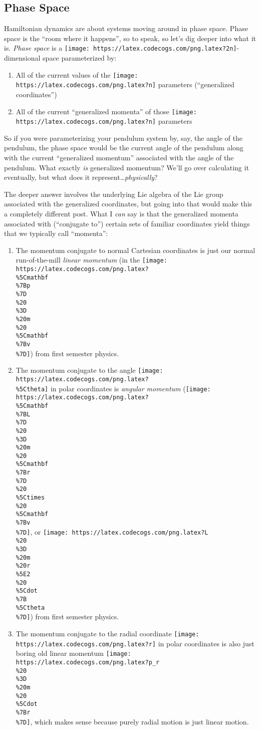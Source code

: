 \documentclass[]{article}
\begin{document}
\subsection{Phase Space}\label{phase-space}

Hamiltonian dynamics are about systems moving around in phase space. Phase space
is the ``room where it happens'', so to speak, so let's dig deeper into what it
is. \emph{Phase space} is a
\texttt{[image: https://latex.codecogs.com/png.latex?2n]}-dimensional space
parameterized by:

\begin{enumerate}
\def\labelenumi{\arabic{enumi}.}
\tightlist
\item
  All of the current values of the
  \texttt{[image: https://latex.codecogs.com/png.latex?n]} parameters
  (``generalized coordinates'')
\item
  All of the current ``generalized momenta'' of those
  \texttt{[image: https://latex.codecogs.com/png.latex?n]} parameters
\end{enumerate}

So if you were parameterizing your pendulum system by, say, the angle of the
pendulum, the phase space would be the current angle of the pendulum along with
the current ``generalized momentum'' associated with the angle of the pendulum.
What exactly \emph{is} generalized momentum? We'll go over calculating it
eventually, but what does it represent\ldots{}\emph{physically}?

The deeper answer involves the underlying Lie algebra of the Lie group
associated with the generalized coordinates, but going into that would make this
a completely different post. What I \emph{can} say is that the generalized
momenta associated with (``conjugate to'') certain sets of familiar coordinates
yield things that we typically call ``momenta'':

\begin{enumerate}
\def\labelenumi{\arabic{enumi}.}
\item
  The momentum conjugate to normal Cartesian coordinates is just our normal
  run-of-the-mill \emph{linear momentum} (in the
  \texttt{[image: https://latex.codecogs.com/png.latex?\\\%5Cmathbf\\\%7Bp\\\%7D\\\%20\\\%3D\\\%20m\\\%20\\\%5Cmathbf\\\%7Bv\\\%7D]})
  from first semester physics.
\item
  The momentum conjugate to the angle
  \texttt{[image: https://latex.codecogs.com/png.latex?\\\%5Ctheta]} in polar
  coordinates is \emph{angular momentum}
  (\texttt{[image: https://latex.codecogs.com/png.latex?\\\%5Cmathbf\\\%7BL\\\%7D\\\%20\\\%3D\\\%20m\\\%20\\\%5Cmathbf\\\%7Br\\\%7D\\\%20\\\%5Ctimes\\\%20\\\%5Cmathbf\\\%7Bv\\\%7D]},
  or
  \texttt{[image: https://latex.codecogs.com/png.latex?L\\\%20\\\%3D\\\%20m\\\%20r\\\%5E2\\\%20\\\%5Cdot\\\%7B\\\%5Ctheta\\\%7D]})
  from first semester physics.
\item
  The momentum conjugate to the radial coordinate
  \texttt{[image: https://latex.codecogs.com/png.latex?r]} in polar coordinates
  is also just boring old linear momentum
  \texttt{[image: https://latex.codecogs.com/png.latex?p\_r\\\%20\\\%3D\\\%20m\\\%20\\\%5Cdot\\\%7Br\\\%7D]},
  which makes sense because purely radial motion is just linear motion.
\end{enumerate}
\end{document}
